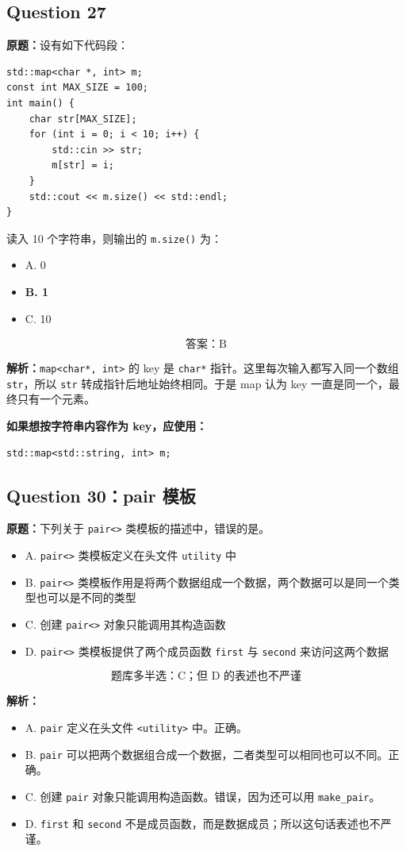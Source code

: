 \documentclass[11pt, a4paper]{article}
\begin{document}
\subsection*{Question 27}
\textbf{原题：}设有如下代码段：
\begin{lstlisting}
std::map<char *, int> m;
const int MAX_SIZE = 100;
int main() {
    char str[MAX_SIZE];
    for (int i = 0; i < 10; i++) {
        std::cin >> str;
        m[str] = i;
    }
    std::cout << m.size() << std::endl;
}
\end{lstlisting}
读入 10 个字符串，则输出的 \texttt{m.size()} 为：
\begin{itemize}
    \item A. 0
    \item \textbf{B. 1}
    \item C. 10
\end{itemize}

\[
\boxed{\text{答案：B}}
\]

\textbf{解析：}\texttt{map<char*, int>} 的 key 是 \texttt{char*} 指针。这里每次输入都写入同一个数组 \texttt{str}，所以 \texttt{str} 转成指针后地址始终相同。于是 map 认为 key 一直是同一个，最终只有一个元素。

\textbf{如果想按字符串内容作为 key，应使用：}
\begin{lstlisting}
std::map<std::string, int> m;
\end{lstlisting}


\subsection*{Question 30：pair 模板}
\textbf{原题：}下列关于 \texttt{pair<>} 类模板的描述中，错误的是。
\begin{itemize}
    \item A. \texttt{pair<>} 类模板定义在头文件 \texttt{utility} 中
    \item B. \texttt{pair<>} 类模板作用是将两个数据组成一个数据，两个数据可以是同一个类型也可以是不同的类型
    \item C. 创建 \texttt{pair<>} 对象只能调用其构造函数
    \item D. \texttt{pair<>} 类模板提供了两个成员函数 \texttt{first} 与 \texttt{second} 来访问这两个数据
\end{itemize}

\[
\boxed{\text{题库多半选：C；但 D 的表述也不严谨}}
\]

\textbf{解析：}
\begin{itemize}
    \item A. \texttt{pair} 定义在头文件 \texttt{<utility>} 中。正确。
    \item B. \texttt{pair} 可以把两个数据组合成一个数据，二者类型可以相同也可以不同。正确。
    \item C. 创建 \texttt{pair} 对象只能调用构造函数。错误，因为还可以用 \texttt{make\_pair}。
    \item D. \texttt{first} 和 \texttt{second} 不是成员函数，而是数据成员；所以这句话表述也不严谨。
\end{itemize}
\end{document}
